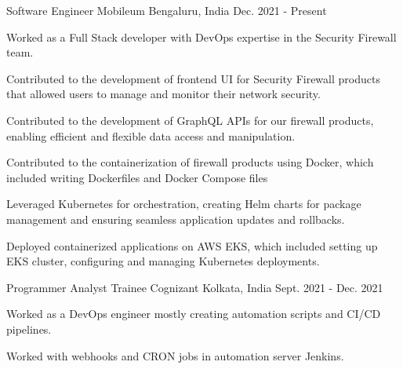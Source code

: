 

\begin{cventries}


  \cventry
    {Software Engineer} %
    {Mobileum} %
    {Bengaluru, India} %
    {Dec. 2021 - Present} %
    {
      \begin{cvitems} %
        \item {Worked as a Full Stack developer with DevOps expertise in the Security Firewall team.}
        \item {Contributed to the development of frontend UI for Security Firewall products that allowed users to manage and monitor their network security.}
        \item {Contributed to the development of GraphQL APIs for our firewall products, enabling efficient and flexible data access and manipulation.}
        \item {Contributed to the containerization of firewall products using Docker, which included writing Dockerfiles and Docker Compose files}
        \item {Leveraged Kubernetes for orchestration, creating Helm charts for package management and ensuring seamless application updates and rollbacks.}
        \item {Deployed containerized applications on AWS EKS, which included setting up EKS cluster, configuring and managing Kubernetes deployments.}
      \end{cvitems}
    }


  \cventry
    {Programmer Analyst Trainee} %
    {Cognizant} %
    {Kolkata, India} %
    {Sept. 2021 - Dec. 2021} %
    {
      \begin{cvitems} %
        \item {Worked as a DevOps engineer mostly creating automation scripts and CI/CD pipelines.}
        \item {Worked with webhooks and CRON jobs in automation server Jenkins.}
      \end{cvitems}
    }

\end{cventries}
